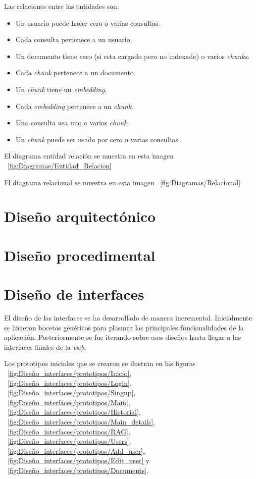 Las relaciones entre las entidades son:
\begin{itemize}
\tightlist
	\item Un usuario puede hacer cero o varias consultas.
	\item Cada consulta pertenece a un usuario.
	\item Un documento tiene cero (si esta cargado pero no indexado) o varios \textit{chunks}.
	\item Cada \textit{chunk} pertenece a un documento.
	\item Un \textit{chunk} tiene un \textit{embedding}.
	\item Cada \textit{embedding} pertenece a un \textit{chunk}.
	\item Una consulta usa uno o varios \textit{chunk}.
	\item Un \textit{chunk} puede ser usado por cero o varias consultas.
\end{itemize}

El diagrama entidad relación se muestra en esta imagen ~\ref{fig:Diagramas/Entidad_Relacion}

El diagrama relacional se muestra en esta imagen ~\ref{fig:Diagramas/Relacional}


\section{Diseño arquitectónico}

\section{Diseño procedimental}

\section{Diseño de interfaces}

El diseño de las interfaces se ha desarrollado de manera incremental. Inicialmente se hicieron bocetos genéricos para plasmar las principales funcionalidades de la aplicación. Posteriormente se fue iterando sobre esos diseños hasta llegar a las interfaces finales de la \textit{web}.

Los prototipos iniciales que se crearon se ilustran en las figuras ~\ref{fig:Diseño_interfaces/prototipos/Inicio}, ~\ref{fig:Diseño_interfaces/prototipos/Login}, ~\ref{fig:Diseño_interfaces/prototipos/Singup}, ~\ref{fig:Diseño_interfaces/prototipos/Main}, ~\ref{fig:Diseño_interfaces/prototipos/Historial}, ~\ref{fig:Diseño_interfaces/prototipos/Main_details}, ~\ref{fig:Diseño_interfaces/prototipos/RAG}, ~\ref{fig:Diseño_interfaces/prototipos/Users}, ~\ref{fig:Diseño_interfaces/prototipos/Add_user}, ~\ref{fig:Diseño_interfaces/prototipos/Edit_user} y ~\ref{fig:Diseño_interfaces/prototipos/Documents}.

